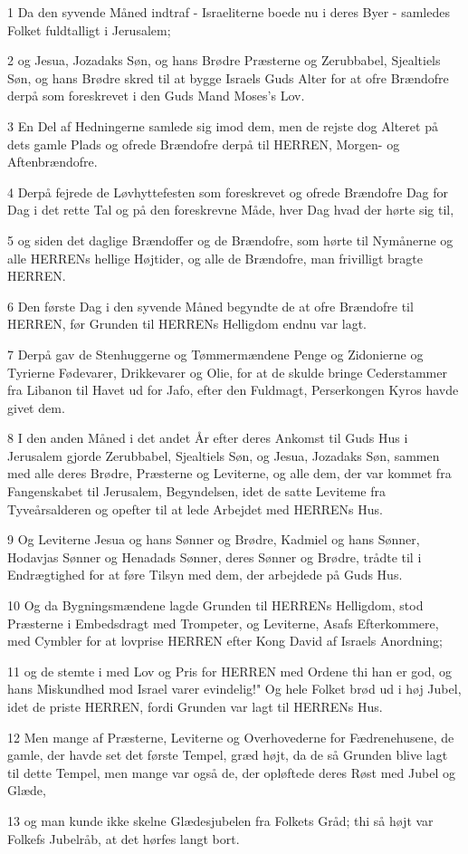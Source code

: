 \par 1 Da den syvende Måned indtraf - Israeliterne boede nu i deres Byer - samledes Folket fuldtalligt i Jerusalem;
\par 2 og Jesua, Jozadaks Søn, og hans Brødre Præsterne og Zerubbabel, Sjealtiels Søn, og hans Brødre skred til at bygge Israels Guds Alter for at ofre Brændofre derpå som foreskrevet i den Guds Mand Moses's Lov.
\par 3 En Del af Hedningerne samlede sig imod dem, men de rejste dog Alteret på dets gamle Plads og ofrede Brændofre derpå til HERREN, Morgen- og Aftenbrændofre.
\par 4 Derpå fejrede de Løvhyttefesten som foreskrevet og ofrede Brændofre Dag for Dag i det rette Tal og på den foreskrevne Måde, hver Dag hvad der hørte sig til,
\par 5 og siden det daglige Brændoffer og de Brændofre, som hørte til Nymånerne og alle HERRENs hellige Højtider, og alle de Brændofre, man frivilligt bragte HERREN.
\par 6 Den første Dag i den syvende Måned begyndte de at ofre Brændofre til HERREN, før Grunden til HERRENs Helligdom endnu var lagt.
\par 7 Derpå gav de Stenhuggerne og Tømmermændene Penge og Zidonierne og Tyrierne Fødevarer, Drikkevarer og Olie, for at de skulde bringe Cederstammer fra Libanon til Havet ud for Jafo, efter den Fuldmagt, Perserkongen Kyros havde givet dem.
\par 8 I den anden Måned i det andet År efter deres Ankomst til Guds Hus i Jerusalem gjorde Zerubbabel, Sjealtiels Søn, og Jesua, Jozadaks Søn, sammen med alle deres Brødre, Præsterne og Leviterne, og alle dem, der var kommet fra Fangenskabet til Jerusalem, Begyndelsen, idet de satte Leviteme fra Tyveårsalderen og opefter til at lede Arbejdet med HERRENs Hus.
\par 9 Og Leviterne Jesua og hans Sønner og Brødre, Kadmiel og hans Sønner, Hodavjas Sønner og Henadads Sønner, deres Sønner og Brødre, trådte til i Endrægtighed for at føre Tilsyn med dem, der arbejdede på Guds Hus.
\par 10 Og da Bygningsmændene lagde Grunden til HERRENs Helligdom, stod Præsterne i Embedsdragt med Trompeter, og Leviterne, Asafs Efterkommere, med Cymbler for at lovprise HERREN efter Kong David af Israels Anordning;
\par 11 og de stemte i med Lov og Pris for HERREN med Ordene thi han er god, og hans Miskundhed mod Israel varer evindelig!" Og hele Folket brød ud i høj Jubel, idet de priste HERREN, fordi Grunden var lagt til HERRENs Hus.
\par 12 Men mange af Præsterne, Leviterne og Overhovederne for Fædrenehusene, de gamle, der havde set det første Tempel, græd højt, da de så Grunden blive lagt til dette Tempel, men mange var også de, der opløftede deres Røst med Jubel og Glæde,
\par 13 og man kunde ikke skelne Glædesjubelen fra Folkets Gråd; thi så højt var Folkefs Jubelråb, at det hørfes langt bort.

